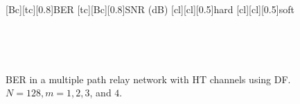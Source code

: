 \begin{figure}
    [Bc][tc][0.8]{BER}
    [tc][Bc][0.8]{SNR (dB)}
    [cl][cl][0.5]{hard}
    [cl][cl][0.5]{soft}

\centerline{
	 \\
}
\centerline{
	 \\
}
\caption{BER in a multiple path relay network with HT channels using DF.  $N = 128, m = 1, 2, 3$, and $4$.}
\label{fig:mp_df_ber_plots_HT}
\end{figure}


